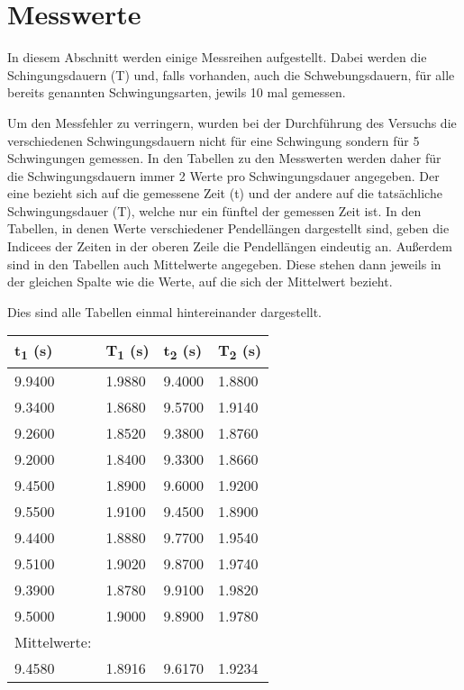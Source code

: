 \documentclass[titlepage=firstcover, captions=tableheading]{scrartcl}
\begin{document}
\section{Messwerte}
In diesem Abschnitt werden einige Messreihen aufgestellt.
Dabei werden die Schingungsdauern (T) und, falls vorhanden, auch die Schwebungsdauern, für alle bereits genannten Schwingungsarten,
jewils 10 mal gemessen.

\noindent Um den Messfehler zu verringern, wurden bei der Durchführung des Versuchs die verschiedenen Schwingungsdauern
nicht für eine Schwingung sondern für 5 Schwingungen gemessen. In den Tabellen zu den Messwerten werden daher für die Schwingungsdauern
immer 2 Werte pro Schwingungsdauer angegeben. Der eine bezieht sich auf die gemessene Zeit (t) und 
der andere auf die tatsächliche Schwingungsdauer (T), welche nur ein fünftel der gemessen Zeit ist.
In den Tabellen, in denen Werte verschiedener Pendellängen dargestellt sind, geben die Indicees der Zeiten in der oberen Zeile die Pendellängen eindeutig an.
Außerdem sind in den Tabellen auch Mittelwerte angegeben. Diese stehen dann jeweils in der gleichen Spalte wie die Werte, auf die sich der Mittelwert bezieht.

\noindent Dies sind alle Tabellen einmal hintereinander dargestellt.



    \begin{minipage}{\linewidth}
        \centering
    \begin{tabular}{llll}
        \toprule
        t\textsubscript{1} (s) & T\textsubscript{1} (s) & t\textsubscript{2} (s) & T\textsubscript{2} (s) \\
        \midrule
        9.9400  &    1.9880  & 9.4000 & 1.8800 \\
        9.3400  &    1.8680  & 9.5700 & 1.9140 \\
        9.2600  &    1.8520  & 9.3800 & 1.8760 \\
        9.2000  &    1.8400  & 9.3300 & 1.8660 \\
        9.4500  &    1.8900  & 9.6000 & 1.9200 \\
        9.5500  &    1.9100  & 9.4500 & 1.8900 \\
        9.4400  &    1.8880  & 9.7700 & 1.9540 \\
        9.5100  &    1.9020  & 9.8700 & 1.9740 \\
        9.3900  &    1.8780  & 9.9100 & 1.9820 \\
        9.5000  &    1.9000  & 9.8900 & 1.9780 \\
        \midrule
        Mittelwerte:\\
        9.4580 & 1.8916 & 9.6170 & 1.9234  \\
        \bottomrule
        
    \end{tabular}
    \label{tab:1}
\end{minipage}
\end{document}
